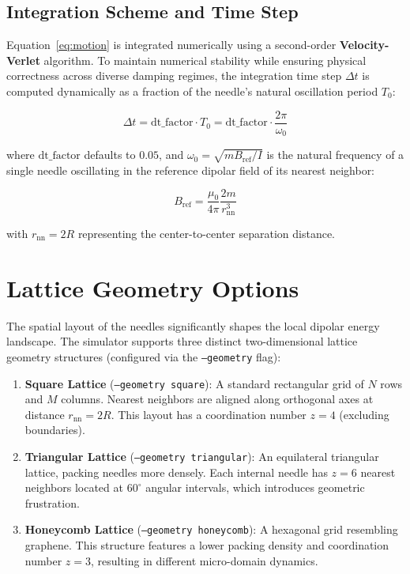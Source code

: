 \documentclass[11pt,a4paper]{article}
\newcommand{\code}[1]{\texttt{#1}}
\begin{document}
\subsection{Integration Scheme and Time Step}
Equation~\eqref{eq:motion} is integrated numerically using a second-order \textbf{Velocity-Verlet} algorithm. To maintain numerical stability while ensuring physical correctness across diverse damping regimes, the integration time step $\Delta t$ is computed dynamically as a fraction of the needle's natural oscillation period $T_0$:

\begin{equation}
\Delta t = \text{dt\_factor} \cdot T_0 = \text{dt\_factor} \cdot \frac{2\pi}{\omega_0}
\end{equation}

\noindent
where $\text{dt\_factor}$ defaults to $0.05$, and $\omega_0 = \sqrt{m B_{\text{ref}}/I}$ is the natural frequency of a single needle oscillating in the reference dipolar field of its nearest neighbor:

\begin{equation}
B_{\text{ref}} = \frac{\mu_0}{4\pi}\frac{2m}{r_{\mathrm{nn}}^3}
\end{equation}

\noindent
with $r_{\mathrm{nn}} = 2R$ representing the center-to-center separation distance.

\section{Lattice Geometry Options}
\label{sec:geometries}

The spatial layout of the needles significantly shapes the local dipolar energy landscape. The simulator supports three distinct two-dimensional lattice geometry structures (configured via the \code{--geometry} flag):

\begin{enumerate}
    \item \textbf{Square Lattice} (\code{--geometry square}): A standard rectangular grid of $N$ rows and $M$ columns. Nearest neighbors are aligned along orthogonal axes at distance $r_{\mathrm{nn}} = 2R$. This layout has a coordination number $z=4$ (excluding boundaries).
    \item \textbf{Triangular Lattice} (\code{--geometry triangular}): An equilateral triangular lattice, packing needles more densely. Each internal needle has $z=6$ nearest neighbors located at $60^{\circ}$ angular intervals, which introduces geometric frustration.
    \item \textbf{Honeycomb Lattice} (\code{--geometry honeycomb}): A hexagonal grid resembling graphene. This structure features a lower packing density and coordination number $z=3$, resulting in different micro-domain dynamics.
\end{enumerate}
\end{document}
